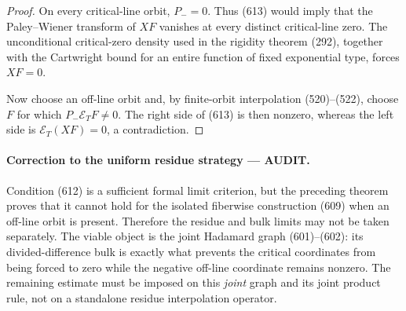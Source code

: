 \documentclass[11pt]{article}
\newcommand{\AUDIT}{\textcolor{orange!75!black}{\textbf{AUDIT}}}
\begin{document}
\begin{proof}
On every critical-line orbit, \(P_-=0\).  Thus (613) would imply that the
Paley--Wiener transform of \(XF\) vanishes at every distinct critical-line
zero.  The unconditional critical-zero density used in the rigidity theorem
(292), together with the Cartwright bound for an entire function of fixed
exponential type, forces \(XF=0\).

Now choose an off-line orbit and, by finite-orbit interpolation
(520)--(522), choose \(F\) for which
\(P_-\mathcal E_TF\ne0\).  The right side of (613) is then nonzero, whereas
the left side is \(\mathcal E_T(XF)=0\), a contradiction.
\end{proof}

\paragraph{Correction to the uniform residue strategy --- \AUDIT.}
Condition (612) is a sufficient formal limit criterion, but the preceding
theorem proves that it cannot hold for the isolated fiberwise construction
(609) when an off-line orbit is present.  Therefore the residue and bulk
limits may not be taken separately.  The viable object is the joint
Hadamard graph (601)--(602): its divided-difference bulk is exactly what
prevents the critical coordinates from being forced to zero while the
negative off-line coordinate remains nonzero.  The remaining estimate must
be imposed on this \emph{joint} graph and its joint product rule, not on a
standalone residue interpolation operator.
\end{document}
